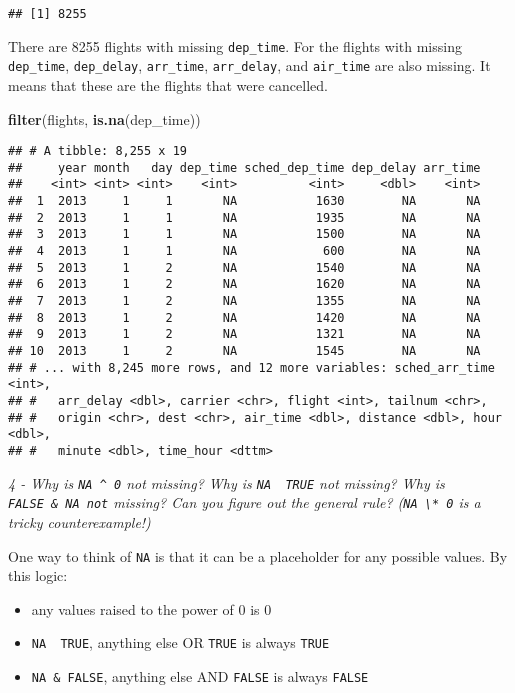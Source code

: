 \documentclass[]{article}
\newenvironment{Shaded}{\begin{snugshade}}{\end{snugshade}}
\newcommand{\KeywordTok}[1]{\textcolor[rgb]{0.13,0.29,0.53}{\textbf{#1}}}
\newcommand{\NormalTok}[1]{#1}
\providecommand{\tightlist}{%
  \setlength{\itemsep}{0pt}\setlength{\parskip}{0pt}}
\theoremstyle{definition}
\theoremstyle{definition}
\theoremstyle{definition}
\theoremstyle{remark}
\begin{document}
\begin{verbatim}
## [1] 8255
\end{verbatim}

There are 8255 flights with missing \texttt{dep\_time}. For the flights
with missing \texttt{dep\_time}, \texttt{dep\_delay},
\texttt{arr\_time}, \texttt{arr\_delay}, and \texttt{air\_time} are also
missing. It means that these are the flights that were cancelled.

\begin{Shaded}
\begin{Highlighting}[]
\KeywordTok{filter}\NormalTok{(flights, }\KeywordTok{is.na}\NormalTok{(dep_time))}
\end{Highlighting}
\end{Shaded}

\begin{verbatim}
## # A tibble: 8,255 x 19
##     year month   day dep_time sched_dep_time dep_delay arr_time
##    <int> <int> <int>    <int>          <int>     <dbl>    <int>
##  1  2013     1     1       NA           1630        NA       NA
##  2  2013     1     1       NA           1935        NA       NA
##  3  2013     1     1       NA           1500        NA       NA
##  4  2013     1     1       NA            600        NA       NA
##  5  2013     1     2       NA           1540        NA       NA
##  6  2013     1     2       NA           1620        NA       NA
##  7  2013     1     2       NA           1355        NA       NA
##  8  2013     1     2       NA           1420        NA       NA
##  9  2013     1     2       NA           1321        NA       NA
## 10  2013     1     2       NA           1545        NA       NA
## # ... with 8,245 more rows, and 12 more variables: sched_arr_time <int>,
## #   arr_delay <dbl>, carrier <chr>, flight <int>, tailnum <chr>,
## #   origin <chr>, dest <chr>, air_time <dbl>, distance <dbl>, hour <dbl>,
## #   minute <dbl>, time_hour <dttm>
\end{verbatim}

\emph{4 - Why is \texttt{NA\ \^{}\ 0} not missing? Why is
\texttt{NA\ \textbar{}\ TRUE} not missing? Why is
\texttt{FALSE\ \&\ NA\ not} missing? Can you figure out the general
rule? (\texttt{NA\ \textbackslash{}*\ 0} is a tricky counterexample!)}

One way to think of \texttt{NA} is that it can be a placeholder for any
possible values. By this logic:

\begin{itemize}
\tightlist
\item
  any values raised to the power of 0 is 0
\item
  \texttt{NA\ \textbar{}\ TRUE}, anything else OR \texttt{TRUE} is
  always \texttt{TRUE}
\item
  \texttt{NA\ \&\ FALSE}, anything else AND \texttt{FALSE} is always
  \texttt{FALSE}
\end{itemize}
\end{document}

